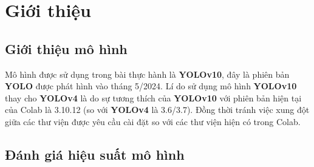 \section{Giới thiệu}
\subsection{Giới thiệu mô hình}
Mô hình được sử dụng trong bài thực hành là \textbf{YOLOv10}, đây là phiên bản \textbf{YOLO} được phát hình vào tháng 5/2024. Lí do sử dụng mô hình \textbf{YOLOv10} thay cho \textbf{YOLOv4} là do sự tương thích của \textbf{YOLOv10} với phiên bản hiện tại của Colab là 3.10.12 (so với \textbf{YOLOv4} là 3.6/3.7). Đồng thời tránh việc xung đột giữa các thư viện được yêu cầu cài đặt so với các thư viện hiện có trong Colab.

\subsection{Đánh giá hiệu suất mô hình}

